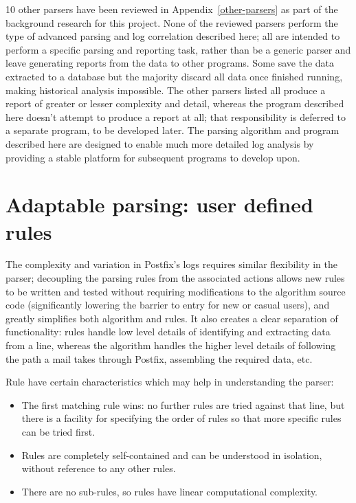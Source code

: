 \documentclass[a4paper,12pt,draft]{article}
\begin{document}
10 other parsers have been reviewed in Appendix~\ref{other-parsers} as part
of the background research for this project.  None of the reviewed parsers
perform the type of advanced parsing and log correlation described here;
all are intended to perform a specific parsing and reporting task, rather
than be a generic parser and leave generating reports from the data to
other programs.  Some save the data extracted to a database but the
majority discard all data once finished running, making historical analysis
impossible.  The other parsers listed all produce a report of greater or
lesser complexity and detail, whereas the program described here doesn't
attempt to produce a report at all; that responsibility is deferred to a
separate program, to be developed later.  The parsing algorithm and program
described here are designed to enable much more detailed log analysis by
providing a stable platform for subsequent programs to develop upon.


\section{Adaptable parsing: user defined rules}

\label{rules}

The complexity and variation in Postfix's logs requires similar flexibility
in the parser; decoupling the parsing rules from the associated actions
allows new rules to be written and tested without requiring modifications
to the algorithm source code (significantly lowering the barrier to entry
for new or casual users), and greatly simplifies both algorithm and rules.
It also creates a clear separation of functionality: rules handle low level
details of identifying and extracting data from a line, whereas the
algorithm handles the higher level details of following the path a mail
takes through Postfix, assembling the required data, etc.

Rule have certain characteristics which may help in understanding the
parser:

\begin{itemize}

    \item The first matching rule wins: no further rules are tried against
        that line, but there is a facility for specifying the order of
        rules so that more specific rules can be tried first.

    \item Rules are completely self-contained and can be understood in
        isolation, without reference to any other rules.

    \item There are no sub-rules, so rules have linear computational
        complexity.

\end{itemize}
\end{document}
